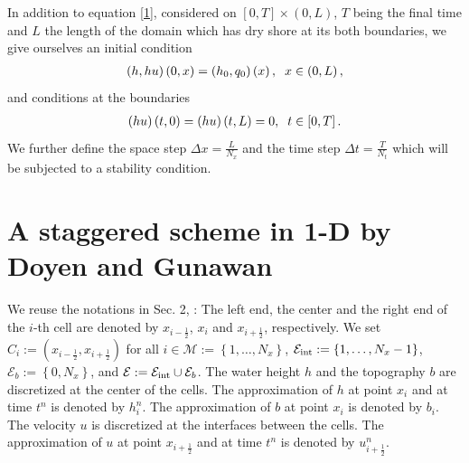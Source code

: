 \documentclass[11pt,a4paper,center,notitlepage]{article}
\numberwithin{equation}{section}
\begin{document}
In addition to equation \eqref{1}, considered on $\left[0,T\right] \times \left(0,L\right)$, $T$ being the final time and $L$ the length of the domain which has dry shore at its both boundaries, we give ourselves an initial condition 
\begin{align*}
\left( {h,hu} \right)\left( {0,x} \right) = \left( {{h_0},{q_0}} \right)\left( x \right), \hspace{2mm} x \in \left( {0,L} \right),
\end{align*}
and conditions at the boundaries
\begin{align*}
\left( {hu} \right)\left( {t,0} \right) = \left( {hu} \right)\left( {t,L} \right) = 0, \hspace{2mm} t \in \left[ {0,T} \right].
\end{align*}
We further define the space step $\Delta x =\frac{L}{N_x}$ and the time step $\Delta t = \frac{T}{N_t}$ which will be subjected to a stability condition. 

\section{A staggered scheme in 1-D by Doyen and Gunawan}
We reuse the notations in Sec. 2, \cite[p. 229]{Doyen2014}: The left end, the center and the right end of the $i$-th cell are denoted by $x_{i-\frac{1}{2}}$, $x_i$ and $x_{i+\frac{1}{2}}$, respectively. We set $C_i := \left(x_{i-\frac{1}{2}},x_{i+\frac{1}{2}}\right)$ for all $i\in \mathcal{M}:= \left\{1,\ldots,N_x\right\}$, $\mathcal{E}_{\rm int} := \left\{1,\ldots,N_x-1\right\}$, $\mathcal{E} _b:= \left\{0,N_x\right\}$, and $\mathcal{E}: = {\mathcal{E}_{\rm int}} \cup {\mathcal{E}_b}$. The water height $h$ and the topography $b$ are discretized at the center of the cells. The approximation of $h$ at point $x_i$ and at time $t^n$ is denoted by $h_i^n$. The approximation of $b$ at point $x_i$ is denoted by $b_i$. The velocity $u$ is discretized at the interfaces between the cells. The approximation of $u$ at point $x_{i+\frac{1}{2}}$ and at time $t^n$ is denoted by $u_{i+\frac{1}{2}}^n$.
\end{document}
